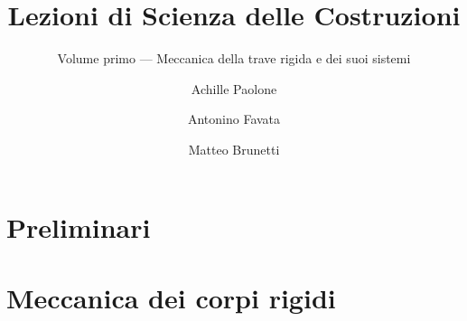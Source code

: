 \documentclass[graybox,envcountchap,sectrefs]{SNmono}
\begin{document}
	\showthe\textwidth


\author{Achille Paolone \and Antonino Favata \and Matteo Brunetti}
\title{Lezioni di Scienza delle Costruzioni}
\subtitle{Volume primo --- Meccanica della trave rigida e dei suoi sistemi}
\maketitle

\frontmatter%
%


%
\tableofcontents

 \printnomenclature   %

\mainmatter%




\part{Preliminari}





%
\part{Meccanica dei corpi rigidi}









%
\end{document}
